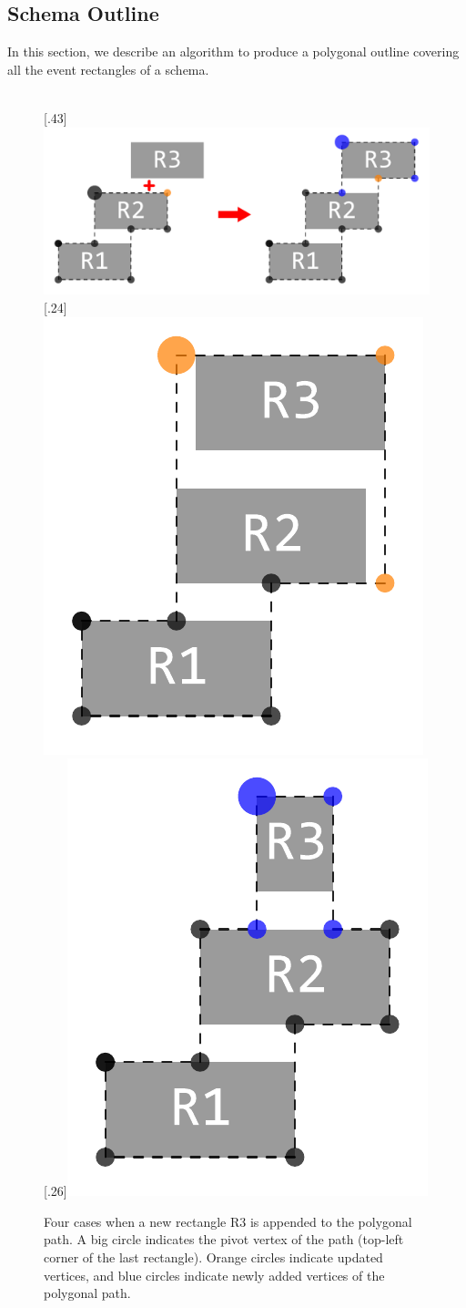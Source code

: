 \subsection{Schema Outline}
In this section, we describe an algorithm to produce a polygonal outline covering all the event rectangles of a schema. 

\begin{figure}[!htb]
	\centering
	\\
	[.43\linewidth]{\includegraphics[height=0.2\columnwidth]{example-up}}
	\hfill
	[.24\linewidth]{\includegraphics[height=0.2\columnwidth]{example-up-smoothing}}
	\hfill
	[.26\linewidth]{\includegraphics[height=0.2\columnwidth]{example-up-shorter}}
	\caption{Four cases when a new rectangle \textrm{R3} is appended to the polygonal path. A big circle indicates the pivot vertex of the path (top-left corner of the last rectangle). Orange circles indicate updated vertices, and blue circles indicate newly added vertices of the polygonal path.}
	\label{fig:sl-outline}
\end{figure}


